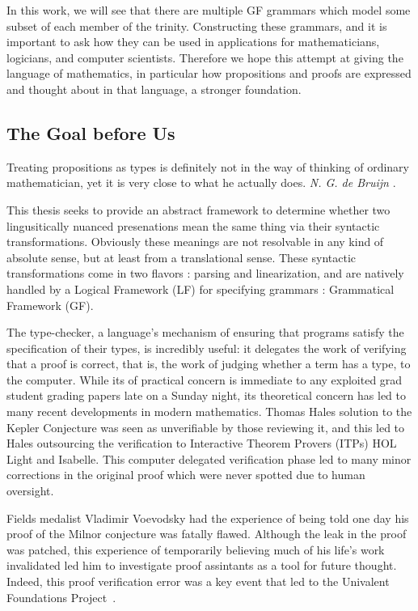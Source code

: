 In this work, we will see that there are multiple GF grammars which model some
subset of each member of the trinity. Constructing these grammars, and it is
important to ask how they can be used in applications for mathematicians,
logicians, and computer scientists. Therefore we hope this attempt at giving the
language of mathematics, in particular how propositions and proofs are expressed
and thought about in that language, a stronger foundation.

\subsection{The Goal before Us }
\begin{displayquote}
Treating propositions as types is definitely not in the way of thinking of
ordinary mathematician, yet it is very close to what he actually does. 
\emph{N. G. de Bruijn} \cite{deBruijn1983}.
\end{displayquote}

This thesis seeks to provide an abstract framework to determine whether two
lingusitically nuanced presenations mean the same thing via their syntactic
transformations. Obviously these meanings are not resolvable in any kind of
absolute sense, but at least from a translational sense. These syntactic
transformations come in two flavors : parsing and linearization, and are
natively handled by a Logical Framework (LF) for specifying grammars :
Grammatical Framework (GF).

The type-checker, a language's mechanism of ensuring that programs satisfy the
specification of their types, is incredibly useful: it delegates the work of
verifying that a proof is correct, that is, the work of judging whether a term
has a type, to the computer. While its of practical concern is immediate to any
exploited grad student grading papers late on a Sunday night, its theoretical
concern has led to many recent developments in modern mathematics. Thomas Hales
solution to the Kepler Conjecture was seen as unverifiable by those reviewing
it, and this led to Hales outsourcing the verification to Interactive Theorem
Provers (ITPs) HOL Light and Isabelle. This computer delegated verification
phase led to many minor corrections in the original proof which were never
spotted due to human oversight.

Fields medalist Vladimir Voevodsky had the experience of being told one day
his proof of the Milnor conjecture was fatally flawed. Although the leak in the
proof was patched, this experience of temporarily believing much of his life's
work invalidated led him to investigate proof assintants as a tool for future
thought. Indeed, this proof verification error was a key event that led to the
Univalent Foundations
Project~\cite{theunivalentfoundationsprogram-homotopytypetheory-2013}.

